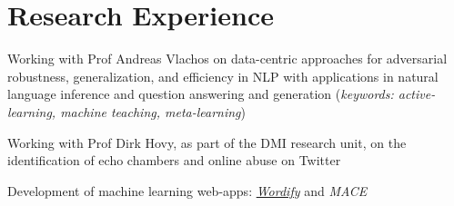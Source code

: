 \documentclass[]{deedy-resume-reversed}
\begin{document}
%
%

%
%

%
%

\begin{minipage}[t]{0.60\textwidth}



\section{Research Experience}

\vspace{\topsep}
\begin{tightemize}
\item Working with Prof Andreas Vlachos on data-centric approaches for adversarial robustness, generalization, and efficiency in NLP with applications in natural language inference and question answering and generation
(\textit{keywords: active-learning, machine teaching, meta-learning})
\end{tightemize}
\sectionsep

\begin{tightemize}
\item Working with Prof Dirk Hovy, as part of the DMI research unit, on the identification of echo chambers and online abuse on Twitter
\item Development of machine learning web-apps: \href{https://wordify.unibocconi.it/}{\it Wordify} and \textit{MACE}
\end{tightemize}
\sectionsep



\end{minipage}
\end{document}
